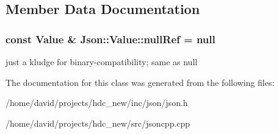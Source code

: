 \subsection{Member Data Documentation}
\subsubsection[{\texorpdfstring{null\+Ref}{nullRef}}]{\setlength{\rightskip}{0pt plus 5cm}const {\bf Value} \& Json\+::\+Value\+::null\+Ref = {\bf null}\hspace{0.3cm}{\ttfamily [static]}}\hypertarget{class_json_1_1_value_aaa4ffd4e53967170c3e8c9abf682b5cd}{}\label{class_json_1_1_value_aaa4ffd4e53967170c3e8c9abf682b5cd}
just a kludge for binary-\/compatibility; same as null 

The documentation for this class was generated from the following files\+:\begin{DoxyCompactItemize}
\item 
/home/david/projects/hdc\+\_\+new/inc/json/json.\+h\item 
/home/david/projects/hdc\+\_\+new/src/jsoncpp.\+cpp\end{DoxyCompactItemize}
